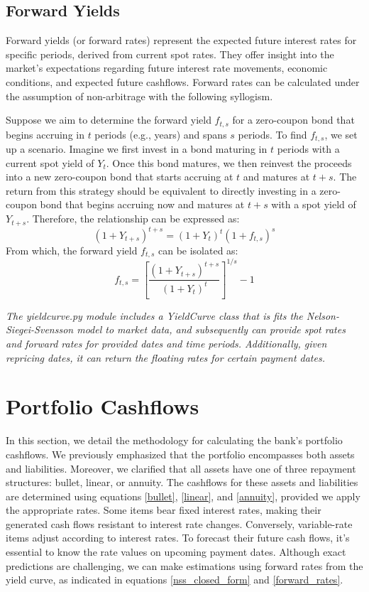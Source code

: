 \documentclass[11pt]{article}
\begin{document}
 \subsection{Forward Yields}

Forward yields (or forward rates) represent the expected future interest rates for specific periods, derived from current spot rates. They offer insight into the market's expectations regarding future interest rate movements, economic conditions, and expected future cashflows. Forward rates can be calculated under the assumption of non-arbitrage with the following syllogism. 

Suppose we aim to determine the forward yield \(f_{t,s}\) for a zero-coupon bond that begins accruing in \(t\) periods (e.g., years) and spans \(s\) periods. To find \(f_{t,s}\), we set up a scenario. Imagine we first invest in a bond maturing in \(t\) periods with a current spot yield of \(Y_t\). Once this bond matures, we then reinvest the proceeds into a new zero-coupon bond that starts accruing at \(t\) and matures at \(t+s\). The return from this strategy should be equivalent to directly investing in a zero-coupon bond that begins accruing now and matures at \(t+s\) with a spot yield of \(Y_{t+s}\). Therefore, the relationship can be expressed as:
\begin{equation}
(1 + Y_{t+s})^{t+s} = (1 + Y_t)^t(1 + f_{t,s})^s
\end{equation}
From which, the forward yield \(f_{t,s}\) can be isolated as:
\begin{equation}
f_{t,s} = \left[ \frac{(1 + Y_{t+s})^{t+s}}{(1 + Y_t)^t} \right]^{1/s} - 1
\label{forward_rates}
\end{equation}


\textit{The yieldcurve.py module includes a YieldCurve class that is fits the Nelson-Siegei-Svensson model to market data, and subsequently can provide spot rates and forward rates for provided dates and time periods. Additionally, given repricing dates, it can return the floating rates for certain payment dates.
}

\section{Portfolio Cashflows}

In this section, we detail the methodology for calculating the bank's portfolio cashflows. We previously emphasized that the portfolio encompasses both assets and liabilities. Moreover, we clarified that all assets have one of three repayment structures: bullet, linear, or annuity. The cashflows for these assets and liabilities are determined using equations \eqref{bullet}, \eqref{linear}, and \eqref{annuity}, provided we apply the appropriate rates. Some items bear fixed interest rates, making their generated cash flows resistant to interest rate changes. Conversely, variable-rate items adjust according to interest rates. To forecast their future cash flows, it's essential to know the rate values on upcoming payment dates. Although exact predictions are challenging, we can make estimations using forward rates from the yield curve, as indicated in equations \eqref{nss_closed_form} and \eqref{forward_rates}.
\end{document}
